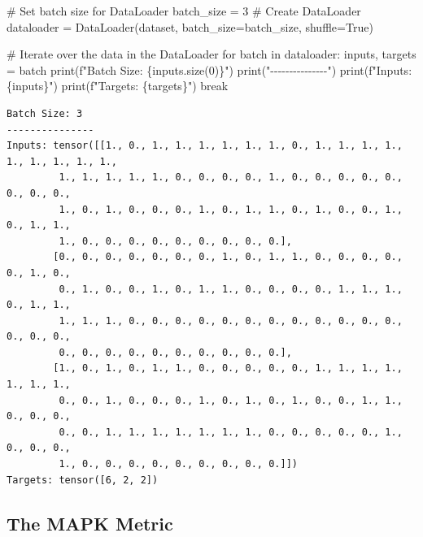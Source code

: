 \documentclass[
  letterpaper,
  DIV=11,
  numbers=noendperiod]{scrreprt}
\newenvironment{Shaded}{\begin{snugshade}}{\end{snugshade}}
\newcommand{\BuiltInTok}[1]{\textcolor[rgb]{0.00,0.23,0.31}{#1}}
\newcommand{\CommentTok}[1]{\textcolor[rgb]{0.37,0.37,0.37}{#1}}
\newcommand{\ControlFlowTok}[1]{\textcolor[rgb]{0.00,0.23,0.31}{#1}}
\newcommand{\DecValTok}[1]{\textcolor[rgb]{0.68,0.00,0.00}{#1}}
\newcommand{\KeywordTok}[1]{\textcolor[rgb]{0.00,0.23,0.31}{#1}}
\newcommand{\NormalTok}[1]{\textcolor[rgb]{0.00,0.23,0.31}{#1}}
\newcommand{\OperatorTok}[1]{\textcolor[rgb]{0.37,0.37,0.37}{#1}}
\newcommand{\SpecialCharTok}[1]{\textcolor[rgb]{0.37,0.37,0.37}{#1}}
\newcommand{\SpecialStringTok}[1]{\textcolor[rgb]{0.13,0.47,0.30}{#1}}
\newcommand{\StringTok}[1]{\textcolor[rgb]{0.13,0.47,0.30}{#1}}
\newcommand{\VariableTok}[1]{\textcolor[rgb]{0.07,0.07,0.07}{#1}}
\begin{document}
\begin{Shaded}
\begin{Highlighting}[]
\CommentTok{\# Set batch size for DataLoader}
\NormalTok{batch\_size }\OperatorTok{=} \DecValTok{3}
\CommentTok{\# Create DataLoader}
\NormalTok{dataloader }\OperatorTok{=}\NormalTok{ DataLoader(dataset, batch\_size}\OperatorTok{=}\NormalTok{batch\_size, shuffle}\OperatorTok{=}\VariableTok{True}\NormalTok{)}

\CommentTok{\# Iterate over the data in the DataLoader}
\ControlFlowTok{for}\NormalTok{ batch }\KeywordTok{in}\NormalTok{ dataloader:}
\NormalTok{    inputs, targets }\OperatorTok{=}\NormalTok{ batch}
    \BuiltInTok{print}\NormalTok{(}\SpecialStringTok{f"Batch Size: }\SpecialCharTok{\{}\NormalTok{inputs}\SpecialCharTok{.}\NormalTok{size(}\DecValTok{0}\NormalTok{)}\SpecialCharTok{\}}\SpecialStringTok{"}\NormalTok{)}
    \BuiltInTok{print}\NormalTok{(}\StringTok{"{-}{-}{-}{-}{-}{-}{-}{-}{-}{-}{-}{-}{-}{-}{-}"}\NormalTok{)}
    \BuiltInTok{print}\NormalTok{(}\SpecialStringTok{f"Inputs: }\SpecialCharTok{\{}\NormalTok{inputs}\SpecialCharTok{\}}\SpecialStringTok{"}\NormalTok{)}
    \BuiltInTok{print}\NormalTok{(}\SpecialStringTok{f"Targets: }\SpecialCharTok{\{}\NormalTok{targets}\SpecialCharTok{\}}\SpecialStringTok{"}\NormalTok{)}
    \ControlFlowTok{break}
\end{Highlighting}
\end{Shaded}

\begin{verbatim}
Batch Size: 3
---------------
Inputs: tensor([[1., 0., 1., 1., 1., 1., 1., 1., 0., 1., 1., 1., 1., 1., 1., 1., 1., 1.,
         1., 1., 1., 1., 1., 0., 0., 0., 0., 1., 0., 0., 0., 0., 0., 0., 0., 0.,
         1., 0., 1., 0., 0., 0., 1., 0., 1., 1., 0., 1., 0., 0., 1., 0., 1., 1.,
         1., 0., 0., 0., 0., 0., 0., 0., 0., 0.],
        [0., 0., 0., 0., 0., 0., 0., 1., 0., 1., 1., 0., 0., 0., 0., 0., 1., 0.,
         0., 1., 0., 0., 1., 0., 1., 1., 0., 0., 0., 0., 1., 1., 1., 0., 1., 1.,
         1., 1., 1., 0., 0., 0., 0., 0., 0., 0., 0., 0., 0., 0., 0., 0., 0., 0.,
         0., 0., 0., 0., 0., 0., 0., 0., 0., 0.],
        [1., 0., 1., 0., 1., 1., 0., 0., 0., 0., 0., 1., 1., 1., 1., 1., 1., 1.,
         0., 0., 1., 0., 0., 0., 1., 0., 1., 0., 1., 0., 0., 1., 1., 0., 0., 0.,
         0., 0., 1., 1., 1., 1., 1., 1., 1., 0., 0., 0., 0., 0., 1., 0., 0., 0.,
         1., 0., 0., 0., 0., 0., 0., 0., 0., 0.]])
Targets: tensor([6, 2, 2])
\end{verbatim}

\hypertarget{sec-the-mapk-metric-31}{%
\subsection{The MAPK Metric}\label{sec-the-mapk-metric-31}}
\end{document}
